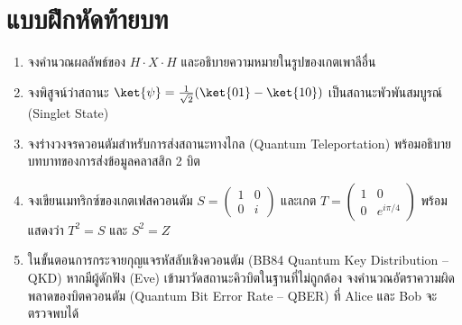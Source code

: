 \section{แบบฝึกหัดท้ายบท}
\begin{enumerate}
    \item จงคำนวณผลลัพธ์ของ $H \cdot X \cdot H$ และอธิบายความหมายในรูปของเกตเพาลีอื่น
    \item จงพิสูจน์ว่าสถานะ $\ket{\psi} = \frac{1}{\sqrt{2}}(\ket{01} - \ket{10})$ เป็นสถานะพัวพันสมบูรณ์ (Singlet State)
    \item จงร่างวงจรควอนตัมสำหรับการส่งสถานะทางไกล (Quantum Teleportation) พร้อมอธิบายบทบาทของการส่งข้อมูลคลาสสิก 2 บิต
    \item จงเขียนเมทริกซ์ของเกตเฟสควอนตัม $S = \begin{pmatrix} 1 & 0 \\ 0 & i \end{pmatrix}$ และเกต $T = \begin{pmatrix} 1 & 0 \\ 0 & e^{i\pi/4} \end{pmatrix}$ พร้อมแสดงว่า $T^2 = S$ และ $S^2 = Z$
    \item ในขั้นตอนการกระจายกุญแจรหัสลับเชิงควอนตัม (BB84 Quantum Key Distribution -- QKD) หากมีผู้ดักฟัง (Eve) เข้ามาวัดสถานะคิวบิตในฐานที่ไม่ถูกต้อง จงคำนวณอัตราความผิดพลาดของบิตควอนตัม (Quantum Bit Error Rate -- QBER) ที่ Alice และ Bob จะตรวจพบได้
\end{enumerate}
